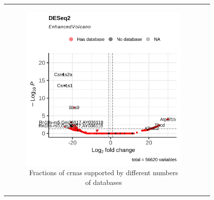 \begin{figure}[ht] \begin{tabular}{cc}
        \begin{subfigure}{0.5\textwidth} \centering

            \includegraphics[width=\linewidth]{chapters/4_results_and_discussion/figures/dea/deseq2/letrozole/volcano.png}
            \caption{Fractions of \glspl{crna} supported by
                different numbers of databases}
            \label{fig:letrozole_volcano_deseq2}
        \end{subfigure}
        \begin{subfigure}{0.5\textwidth}
            \centering


\end{subfigure}
\end{tabular}
\end{figure}
